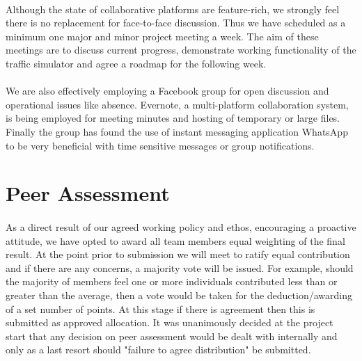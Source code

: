 \documentclass[11pt,a4paper]{article}
\begin{document}
\paragraph{}
Although the state of collaborative platforms are feature-rich, we strongly feel there is no replacement for face-to-face discussion.  Thus we have scheduled as a minimum one major and minor project meeting a week.  The aim of these meetings are to discuss current progress, demonstrate working functionality of the traffic simulator and agree a roadmap for the following week.
\paragraph{}
We are also effectively employing a Facebook group for open discussion and operational issues like absence.  Evernote, a multi-platform collaboration system, is being employed for meeting minutes and hosting of temporary or large files.  Finally the group has found the use of instant messaging application WhatsApp to be very beneficial with time sensitive messages or group notifications.

\section{Peer Assessment}
\paragraph{}
As a direct result of our agreed working policy and ethos, encouraging a proactive attitude, we have opted to award all team members equal weighting of the final result.  At the point prior to submission we will meet to ratify equal contribution and if there are any concerns, a majority vote will be issued.  For example, should the majority of members feel one or more individuals contributed less than or greater than the average, then a vote would be taken for the deduction/awarding of a set number of points.  At this stage if there is agreement then this is submitted as approved allocation.  It was unanimously decided at the project start that any decision on peer assessment would be dealt with internally and only as a last resort should "failure to agree distribution" be submitted.
\end{document}
